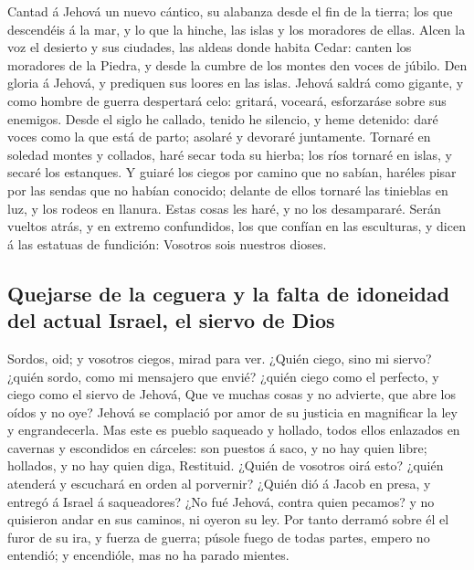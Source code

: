  Cantad á Jehová un nuevo cántico, su alabanza desde el fin
de la tierra; los que descendéis á la mar, y lo que la hinche, las islas
y los moradores de ellas.  Alcen la voz el desierto y sus
ciudades, las aldeas donde habita Cedar: canten los moradores de la
Piedra, y desde la cumbre de los montes den voces de júbilo.
 Den gloria á Jehová, y prediquen sus loores en las islas.
 Jehová saldrá como gigante, y como hombre de guerra
despertará celo: gritará, voceará, esforzaráse sobre sus enemigos.
 Desde el siglo he callado, tenido he silencio, y heme
detenido: daré voces como la que está de parto; asolaré y devoraré
juntamente.  Tornaré en soledad montes y collados, haré
secar toda su hierba; los ríos tornaré en islas, y secaré los estanques.
 Y guiaré los ciegos por camino que no sabían, haréles
pisar por las sendas que no habían conocido; delante de ellos tornaré
las tinieblas en luz, y los rodeos en llanura. Estas cosas les haré, y
no los desampararé.  Serán vueltos atrás, y en extremo
confundidos, los que confían en las esculturas, y dicen á las estatuas
de fundición: Vosotros sois nuestros dioses.

\hypertarget{quejarse-de-la-ceguera-y-la-falta-de-idoneidad-del-actual-israel-el-siervo-de-dios}{%
\subsection{Quejarse de la ceguera y la falta de idoneidad del actual
Israel, el siervo de
Dios}\label{quejarse-de-la-ceguera-y-la-falta-de-idoneidad-del-actual-israel-el-siervo-de-dios}}

 Sordos, oid; y vosotros ciegos, mirad para ver.
 ¿Quién ciego, sino mi siervo? ¿quién sordo, como mi
mensajero que envié? ¿quién ciego como el perfecto, y ciego como el
siervo de Jehová,  Que ve muchas cosas y no advierte, que
abre los oídos y no oye?  Jehová se complació por amor de
su justicia en magnificar la ley y engrandecerla.  Mas este
es pueblo saqueado y hollado, todos ellos enlazados en cavernas y
escondidos en cárceles: son puestos á saco, y no hay quien libre;
hollados, y no hay quien diga, Restituid.  ¿Quién de
vosotros oirá esto? ¿quién atenderá y escuchará en orden al porvernir?
 ¿Quién dió á Jacob en presa, y entregó á Israel á
saqueadores? ¿No fué Jehová, contra quien pecamos? y no quisieron andar
en sus caminos, ni oyeron su ley.  Por tanto derramó sobre
él el furor de su ira, y fuerza de guerra; púsole fuego de todas partes,
empero no entendió; y encendióle, mas no ha parado mientes.

